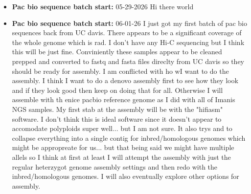 \documentclass{article}
\begin{document}
\begin{itemize}
        Additional note.   We must create a good prior estimate for the model however.   By defaul this tool does not allow more than trisomy.   This shoudl be updatable by formating and creating an addtional TSV with the proper priors.

        Note on priors:  With good read depth the priors really shouldn't matter too much.  This is good because I do not have a great way to estimate the priors.  Perhaps I could use the data that Allie had back in their old paper but I am not sure.   Fundamentally the diploid state is most probable for all samples but I do not know how to estimate any of the others.   That being said from what I understand with good read data the priors really do not matter much.

        To use this tool we must follow this protocol
        \begin{itemize}
            \item GAKT4 PreprocessIntervals - This should be performed on the reference sequence!
            \item GAKT4 CollectReadCounts - This should be performed on the sample
            \item GAKT4 DetermineGermlineContigPloidy - Thi s should be performed on the sample
        \end{itemize}

        

        
        \item \textbf{Pac bio sequence batch start:} {05-29-2026} Hi there world
        
        \item \textbf{Pac bio sequence batch start:} {06-01-26}  I just got my first batch of pac bio sequences back from UC davis.   There appears to be a significant coverage of the whole genome which is rad.  I don't have any Hi-C sequencing but I think this will be just fine.   Conviniently these samples appear to be cleaned prepped and converted to fastq and fasta files direclty from UC davis so they should be ready for assembly.   I am conflicted with ho wI want to do the assembly.   I think I want to do a denovo assembly first to see how they look and if they look good then keep on doing that for all.  Otherwise I will assemble with th enice pacbio reference genome as I did with all of Imanis NGS samples.   My first stab at the assembly will be with the "hifiasm" software.   I don't think this is ideal software since it doesn't appear to accomodate polyploids super well... but I am not sure.   It also trys and to collapse everything into a single contig for inbred/homologous genomes which might be appropreate for us... but that being said we might have multiple allels so I think at first at least I will attempt the assembly with just the regular heterzygot genome assembly settings and then redo with the inbred/homologous genomes.    I will also eventually explore other options for assembly.
    

\end{itemize}
\end{document}
